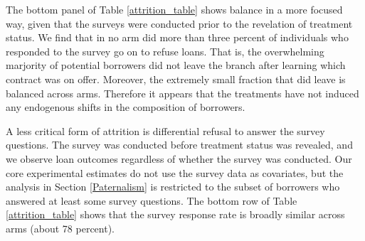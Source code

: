 The bottom panel of Table \ref{attrition_table} shows balance in a more focused way, given that the surveys were conducted prior to the revelation of treatment status. We find that in no arm did more than three percent of individuals who responded to the survey go on to refuse loans. That is, the overwhelming marjority of potential borrowers did not leave the branch after learning which contract was on offer. Moreover, the extremely small fraction that did leave is balanced across arms.  Therefore it appears that the treatments have not induced any endogenous shifts in the composition of borrowers. 

A less critical form of attrition is differential refusal to answer the survey questions.  The survey was conducted before treatment status was revealed, and we observe loan outcomes regardless of whether the survey was conducted.  Our core experimental estimates do not use the survey data as covariates, but the analysis in Section \ref{Paternalism} is restricted to the subset of borrowers who answered at least some survey questions. The bottom row of Table \ref{attrition_table} shows that the survey response rate is broadly similar across arms (about 78 percent). 



